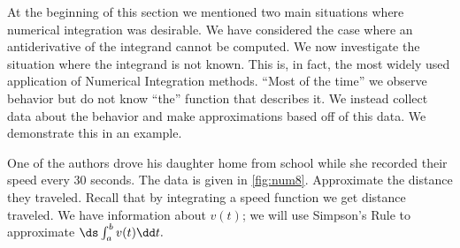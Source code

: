 At the beginning of this section we mentioned two main situations where numerical integration was desirable. We have considered the case where an antiderivative of the integrand cannot be computed. We now investigate the situation where the integrand is not known. This is, in fact, the most widely used application of Numerical Integration methods. ``Most of the time'' we observe behavior but do not know ``the'' function that describes it. We instead collect data about the behavior and make approximations based off of this data. We demonstrate this in an example.

\begin{example}\label{ex_num8}%
One of the authors drove his daughter home from school while she recorded their speed every 30 seconds. The data is given in \autoref{fig:num8}.
%
%
Approximate the distance they traveled.
\solution
Recall that by integrating a speed function we get distance traveled. We have information about $v(t)$; we will use Simpson's Rule to approximate $\ds \int_a^b v(t)\dd t.$ 


\end{example}
